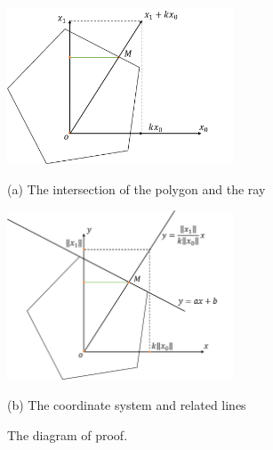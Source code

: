 \documentclass{article}
\begin{document}
\begin{figure}%
	\begin{minipage}[b]{1.0\linewidth}
        \centering
        \includegraphics[width=0.6\textwidth]{proof1.png}
		\centerline{(a) The intersection of the polygon and the ray}\medskip
	\end{minipage}
	\begin{minipage}[b]{1.0\linewidth}
        \centering
        \includegraphics[width=0.6\textwidth]{proof2.png}
		\centerline{(b) The coordinate system and related lines}\medskip
	\end{minipage}

	\caption{The diagram of proof.}
	\label{fig:proof}
\end{figure}
\end{document}
